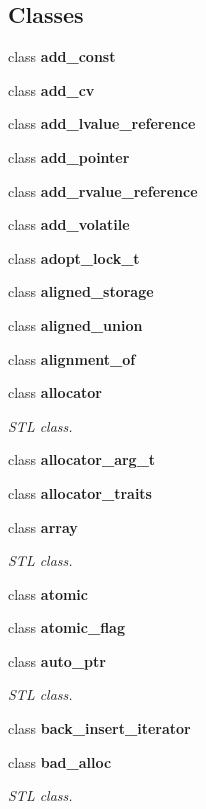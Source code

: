 \subsection*{Classes}
\begin{DoxyCompactItemize}
\item 
class \textbf{ add\+\_\+const}
\item 
class \textbf{ add\+\_\+cv}
\item 
class \textbf{ add\+\_\+lvalue\+\_\+reference}
\item 
class \textbf{ add\+\_\+pointer}
\item 
class \textbf{ add\+\_\+rvalue\+\_\+reference}
\item 
class \textbf{ add\+\_\+volatile}
\item 
class \textbf{ adopt\+\_\+lock\+\_\+t}
\item 
class \textbf{ aligned\+\_\+storage}
\item 
class \textbf{ aligned\+\_\+union}
\item 
class \textbf{ alignment\+\_\+of}
\item 
class \textbf{ allocator}
\begin{DoxyCompactList}\small\item\em S\+TL class. \end{DoxyCompactList}\item 
class \textbf{ allocator\+\_\+arg\+\_\+t}
\item 
class \textbf{ allocator\+\_\+traits}
\item 
class \textbf{ array}
\begin{DoxyCompactList}\small\item\em S\+TL class. \end{DoxyCompactList}\item 
class \textbf{ atomic}
\item 
class \textbf{ atomic\+\_\+flag}
\item 
class \textbf{ auto\+\_\+ptr}
\begin{DoxyCompactList}\small\item\em S\+TL class. \end{DoxyCompactList}\item 
class \textbf{ back\+\_\+insert\+\_\+iterator}
\item 
class \textbf{ bad\+\_\+alloc}
\begin{DoxyCompactList}\small\item\em S\+TL class. \end{DoxyCompactList}\item 

\end{DoxyCompactItemize}
